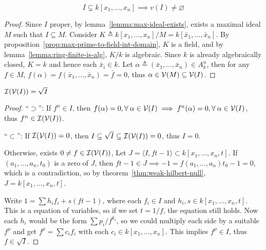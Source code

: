 \begin{theorem} \label{thm:weak-hilbert-null}
  \[ I \subsetneq k[x_1, \dots, x_n] \implies v(I) \neq \varnothing \]

  \begin{proof}
    Since $I$ proper, by lemma~\ref{lemma:max-ideal-exists},
    exists a maximal ideal $M$ such that $I \subseteq M$.
    Consider $K \triangleq k[x_1, \dots, x_n] / M = k[\bar{x}_1, \dots, \bar{x}_n]$.
    By proposition~\ref{prop:max-prime-to-field-int-domain}, $K$ is a field,
    and by lemma~\ref{lemma:ring-finite-is-alg}, $K/k$ is algebraic. Since $k$
    is already algebraically closed, $K = k$ and hence each $\bar{x}_i \in k$.
    Let $\alpha \triangleq (\bar{x}_1, \dots, \bar{x}_n) \in A_k^n$, then
    for any $f \in M$, $f(\alpha) = f(\bar{x}_1, \dots, \bar{x}_n) = \bar{f} = 0$,
    thus $\alpha \in \mathcal{V}(M) \subseteq \mathcal{V}(I)$.
  \end{proof}
\end{theorem}

\begin{theorem}
  $\mathcal{I}(\mathcal{V}(I)) = \sqrt{I}$

  \begin{proof}
    ``$\supset$'': If $f^n \in I$, then $f(\alpha) = 0, \forall \alpha \in \Vc(I)
    \implies f^n(\alpha) = 0, \forall \alpha \in \Vc(I)$, thus $f^n \in \mathcal{I}(\mathcal{V}(I))$.

    ``$\subset$'': If $\mathcal{I}(\mathcal{V}(I)) = 0$, then $I \subseteq \sqrt{I} \subseteq \mathcal{I}(\mathcal{V}(I)) = 0$,
    thus $I = 0$.

    Otherwise, exists $0 \neq f \in \mathcal{I}(\mathcal{V}(I))$, Let $J = \langle I, ft-1 \rangle \subset k[x_1, \dots, x_n, t]$.
    If $(a_1, \dots, a_n, t_0)$ is a zero of $J$, then $ft-1 \in J \implies -1 = f(a_1, \dots, a_n) t_0 - 1 =
    0$, which is a contradiction, so by theorem~\ref{thm:weak-hilbert-null}, $J = k[x_1, \dots, x_n, t]$.

    Write $1 = \sum h_i f_i + s (ft-1)$, where each $f_i \in I$ and
    $h_i, s \in k[x_1, \dots, x_n, t]$.
    This is a equation of variables, so if we set $t = 1/f$, the equation still holds.
    Now each $h_i$ would be the form $\sum p_i / f^{k_i}$, so we could multiply each
    side by a suitable $f^\rho$ and get $f^\rho = \sum c_i f_i$ with each $c_i \in k[x_1, \dots, x_n]$.
    This implies $f^\rho \in I$, thus $f \in \sqrt{I}$.
  \end{proof}
\end{theorem}

